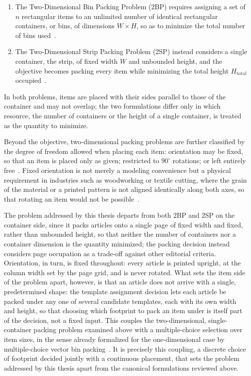 \begin{enumerate}
    \item The Two-Dimensional Bin Packing Problem (2BP) requires assigning a set of $n$ rectangular items to an unlimited number of identical rectangular containers, or bins, of dimensions $W \times H$, so as to minimize the total number of bins used~\cite{lodi-packing-survey}.
    \item The Two-Dimensional Strip Packing Problem (2SP) instead considers a single container, the strip, of fixed width $W$ and unbounded height, and the objective becomes packing every item while minimizing the total height $H_{\text{total}}$ occupied~\cite{lodi-packing-survey}.
\end{enumerate}
In both problems, items are placed with their sides parallel to those of the container and may not overlap; the two formulations differ only in which resource, the number of containers or the height of a single container, is treated as the quantity to minimize.

Beyond the objective, two-dimensional packing problems are further classified by the degree of freedom allowed when placing each item: orientation may be fixed, so that an item is placed only as given; restricted to $90^\circ$ rotations; or left entirely free~\cite{dyckhoff-typology}. Fixed orientation is not merely a modeling convenience but a physical requirement in industries such as woodworking or textile cutting, where the grain of the material or a printed pattern is not aligned identically along both axes, so that rotating an item would not be possible~\cite{lodi-packing-survey}.

The problem addressed by this thesis departs from both 2BP and 2SP on the container side, since it packs articles onto a single page of fixed width and fixed, rather than unbounded height, so that neither the number of containers nor a container dimension is the quantity minimized; the packing decision instead considers page occupation as a trade-off against other editorial criteria. Orientation, in turn, is fixed throughout: every article is printed upright, at the column width set by the page grid, and is never rotated. What sets the item side of the problem apart, however, is that an article does not arrive with a single, predetermined shape: the template assignment decision lets each article be packed under any one of several candidate templates, each with its own width and height, so that choosing which footprint to pack an item under is itself part of the decision, not a fixed input. This couples the two-dimensional, single-container packing problem examined above with a multiple-choice selection over item sizes, in the sense already formalized for the one-dimensional case by multiple-choice vector bin packing~\cite{pattshamir-multichoice-vbp}. It is precisely this coupling, a discrete choice of footprint decided jointly with a continuous placement, that sets the problem addressed by this thesis apart from the canonical formulations reviewed above.

